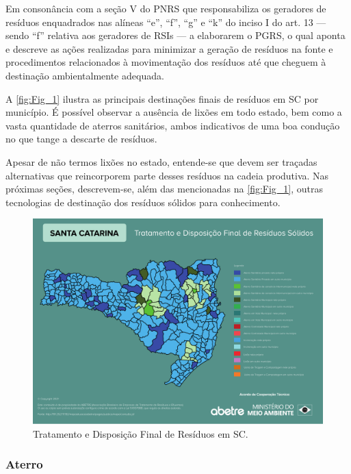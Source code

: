 Em consonância com a seção V do \gls{PNRS} que responsabiliza os geradores de resíduos enquadrados nas alíneas  “e”, “f”, “g” e “k” do inciso I do art. 13 — sendo “f” relativa aos geradores de \gls{RSI}s — a elaborarem o \gls{PGRS}, o qual aponta e descreve as ações realizadas para minimizar a geração de resíduos na fonte e procedimentos relacionados à movimentação dos resíduos até que cheguem à destinação ambientalmente adequada.

A \autoref{fig:Fig_1} ilustra as principais destinações finais de resíduos em \gls{SC} por município. É possível observar a ausência de lixões em todo estado, bem como a vasta quantidade de aterros sanitários, ambos indicativos de uma boa condução no que tange a descarte de resíduos.

Apesar de não termos lixões no estado, entende-se que devem ser traçadas alternativas que reincorporem parte desses resíduos na cadeia produtiva. Nas próximas seções, descrevem-se, além das mencionadas na \autoref{fig:Fig_1}, outras tecnologias de destinação dos resíduos sólidos para conhecimento.


\begin{figure}[h]
	\caption{\label{fig:Fig_1} Tratamento e Disposição Final de Resíduos em SC.}
	\begin{center}
		\includegraphics[scale=0.52]{images/abetre_sc.pdf}
	\end{center}
\end{figure}

\pagebreak
\subsubsection{Aterro}

